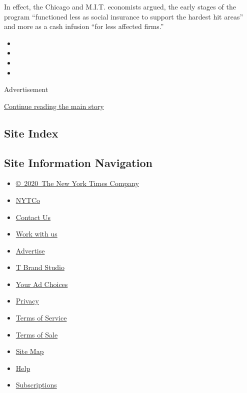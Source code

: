 In effect, the Chicago and M.I.T. economists argued, the early stages of
the program ``functioned less as social insurance to support the hardest
hit areas'' and more as a cash infusion ``for less affected firms.''

\begin{itemize}
\item
\item
\item
\item
\end{itemize}

Advertisement

\protect\hyperlink{after-bottom}{Continue reading the main story}

\hypertarget{site-index}{%
\subsection{Site Index}\label{site-index}}

\hypertarget{site-information-navigation}{%
\subsection{Site Information
Navigation}\label{site-information-navigation}}

\begin{itemize}
\tightlist
\item
  \href{https://help.nytimes.com/hc/en-us/articles/115014792127-Copyright-notice}{©~2020~The
  New York Times Company}
\end{itemize}

\begin{itemize}
\tightlist
\item
  \href{https://www.nytco.com/}{NYTCo}
\item
  \href{https://help.nytimes.com/hc/en-us/articles/115015385887-Contact-Us}{Contact
  Us}
\item
  \href{https://www.nytco.com/careers/}{Work with us}
\item
  \href{https://nytmediakit.com/}{Advertise}
\item
  \href{http://www.tbrandstudio.com/}{T Brand Studio}
\item
  \href{https://www.nytimes.com/privacy/cookie-policy\#how-do-i-manage-trackers}{Your
  Ad Choices}
\item
  \href{https://www.nytimes.com/privacy}{Privacy}
\item
  \href{https://help.nytimes.com/hc/en-us/articles/115014893428-Terms-of-service}{Terms
  of Service}
\item
  \href{https://help.nytimes.com/hc/en-us/articles/115014893968-Terms-of-sale}{Terms
  of Sale}
\item
  \href{https://spiderbites.nytimes.com}{Site Map}
\item
  \href{https://help.nytimes.com/hc/en-us}{Help}
\item
  \href{https://www.nytimes.com/subscription?campaignId=37WXW}{Subscriptions}
\end{itemize}
